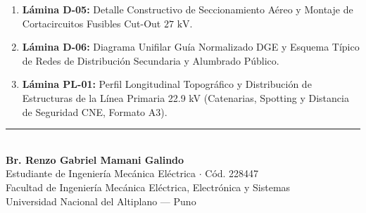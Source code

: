 \documentclass[12pt,a4paper]{report}
\begin{document}
\begin{enumerate}
    \item \textbf{Lámina D-05:} Detalle Constructivo de Seccionamiento Aéreo y Montaje de Cortacircuitos Fusibles Cut-Out $27\text{ kV}$.
    \item \textbf{Lámina D-06:} Diagrama Unifilar Guía Normalizado DGE y Esquema Típico de Redes de Distribución Secundaria y Alumbrado Público.
    \item \textbf{Lámina PL-01:} Perfil Longitudinal Topográfico y Distribución de Estructuras de la Línea Primaria 22.9 kV (Catenarias, Spotting y Distancia de Seguridad CNE, Formato A3).
\end{enumerate}

\newpage










\vfill
\begin{center}
    \rule{0.6\textwidth}{0.6pt}\\[0.2cm]
    \textbf{Br. Renzo Gabriel Mamani Galindo}\\
    Estudiante de Ingeniería Mecánica Eléctrica $\cdot$ Cód. 228447\\
    Facultad de Ingeniería Mecánica Eléctrica, Electrónica y Sistemas\\
    Universidad Nacional del Altiplano --- Puno
\end{center}
\end{document}
